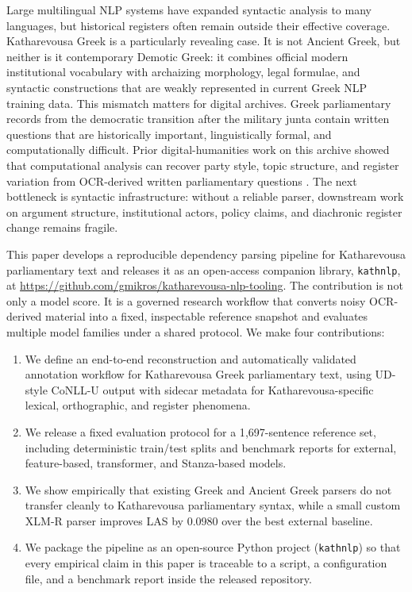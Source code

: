 \documentclass[11pt]{article}
\newcommand{\repobase}{https://github.com/gmikros/katharevousa-nlp-tooling}
\begin{document}
Large multilingual NLP systems have expanded syntactic analysis to many languages, but historical registers often remain outside their effective coverage. Katharevousa Greek is a particularly revealing case. It is not Ancient Greek, but neither is it contemporary Demotic Greek: it combines official modern institutional vocabulary with archaizing morphology, legal formulae, and syntactic constructions that are weakly represented in current Greek NLP training data. This mismatch matters for digital archives. Greek parliamentary records from the democratic transition after the military junta contain written questions that are historically important, linguistically formal, and computationally difficult. Prior digital-humanities work on this archive showed that computational analysis can recover party style, topic structure, and register variation from OCR-derived written parliamentary questions \cite{mikrosfitsilis2025dsh}. The next bottleneck is syntactic infrastructure: without a reliable parser, downstream work on argument structure, institutional actors, policy claims, and diachronic register change remains fragile.

This paper develops a reproducible dependency parsing pipeline for Katharevousa parliamentary text and releases it as an open-access companion library, \texttt{kathnlp}, at \url{\repobase}. The contribution is not only a model score. It is a governed research workflow that converts noisy OCR-derived material into a fixed, inspectable reference snapshot and evaluates multiple model families under a shared protocol. We make four contributions:

\begin{enumerate}[leftmargin=1.5em]
  \item We define an end-to-end reconstruction and automatically validated annotation workflow for Katharevousa Greek parliamentary text, using UD-style CoNLL-U output with sidecar metadata for Katharevousa-specific lexical, orthographic, and register phenomena.
  \item We release a fixed evaluation protocol for a 1{,}697-sentence reference set, including deterministic train/test splits and benchmark reports for external, feature-based, transformer, and Stanza-based models.
  \item We show empirically that existing Greek and Ancient Greek parsers do not transfer cleanly to Katharevousa parliamentary syntax, while a small custom XLM-R parser improves LAS by 0.0980 over the best external baseline.
  \item We package the pipeline as an open-source Python project (\texttt{kathnlp}) so that every empirical claim in this paper is traceable to a script, a configuration file, and a benchmark report inside the released repository.
\end{enumerate}
\end{document}

